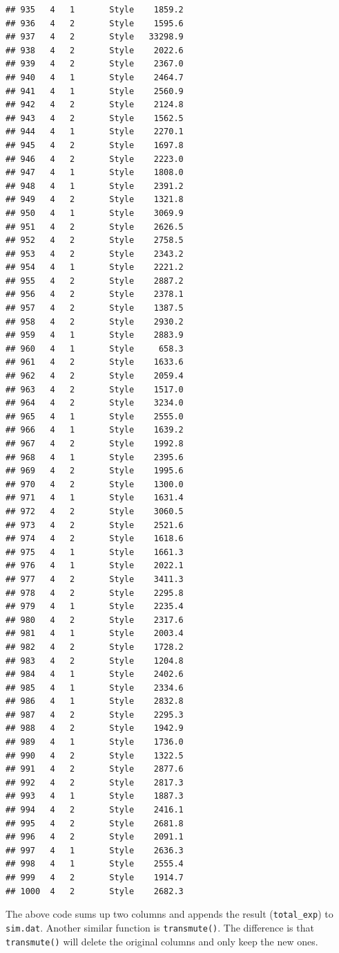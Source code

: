 \documentclass[12pt,]{krantz}
\theoremstyle{definition}
\theoremstyle{definition}
\theoremstyle{remark}
\begin{document}
\begin{verbatim}
## 935   4   1       Style    1859.2
## 936   4   2       Style    1595.6
## 937   4   2       Style   33298.9
## 938   4   2       Style    2022.6
## 939   4   2       Style    2367.0
## 940   4   1       Style    2464.7
## 941   4   1       Style    2560.9
## 942   4   2       Style    2124.8
## 943   4   2       Style    1562.5
## 944   4   1       Style    2270.1
## 945   4   2       Style    1697.8
## 946   4   2       Style    2223.0
## 947   4   1       Style    1808.0
## 948   4   1       Style    2391.2
## 949   4   2       Style    1321.8
## 950   4   1       Style    3069.9
## 951   4   2       Style    2626.5
## 952   4   2       Style    2758.5
## 953   4   2       Style    2343.2
## 954   4   1       Style    2221.2
## 955   4   2       Style    2887.2
## 956   4   2       Style    2378.1
## 957   4   2       Style    1387.5
## 958   4   2       Style    2930.2
## 959   4   1       Style    2883.9
## 960   4   1       Style     658.3
## 961   4   2       Style    1633.6
## 962   4   2       Style    2059.4
## 963   4   2       Style    1517.0
## 964   4   2       Style    3234.0
## 965   4   1       Style    2555.0
## 966   4   1       Style    1639.2
## 967   4   2       Style    1992.8
## 968   4   1       Style    2395.6
## 969   4   2       Style    1995.6
## 970   4   2       Style    1300.0
## 971   4   1       Style    1631.4
## 972   4   2       Style    3060.5
## 973   4   2       Style    2521.6
## 974   4   2       Style    1618.6
## 975   4   1       Style    1661.3
## 976   4   1       Style    2022.1
## 977   4   2       Style    3411.3
## 978   4   2       Style    2295.8
## 979   4   1       Style    2235.4
## 980   4   2       Style    2317.6
## 981   4   1       Style    2003.4
## 982   4   2       Style    1728.2
## 983   4   2       Style    1204.8
## 984   4   1       Style    2402.6
## 985   4   1       Style    2334.6
## 986   4   1       Style    2832.8
## 987   4   2       Style    2295.3
## 988   4   2       Style    1942.9
## 989   4   1       Style    1736.0
## 990   4   2       Style    1322.5
## 991   4   2       Style    2877.6
## 992   4   2       Style    2817.3
## 993   4   1       Style    1887.3
## 994   4   2       Style    2416.1
## 995   4   2       Style    2681.8
## 996   4   2       Style    2091.1
## 997   4   1       Style    2636.3
## 998   4   1       Style    2555.4
## 999   4   2       Style    1914.7
## 1000  4   2       Style    2682.3
\end{verbatim}

The above code sums up two columns and appends the result
(\texttt{total\_exp}) to \texttt{sim.dat}. Another similar function is
\texttt{transmute()}. The difference is that \texttt{transmute()} will
delete the original columns and only keep the new ones.
\end{document}
